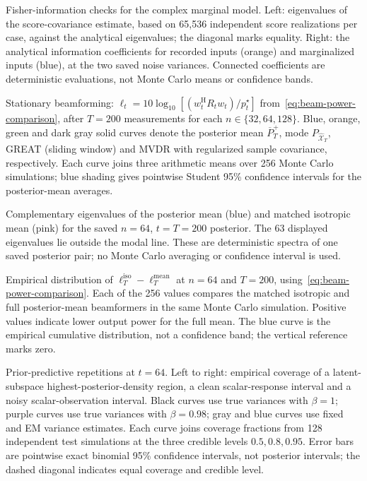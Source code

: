 \caption{Fisher-information checks for the complex marginal model. Left: eigenvalues of the score-covariance estimate, based on 65,536 independent score realizations per case, against the analytical eigenvalues; the diagonal marks equality. Right: the analytical information coefficients for recorded inputs (orange) and marginalized inputs (blue), at the two saved noise variances. Connected coefficients are deterministic evaluations, not Monte Carlo means or confidence bands.}

\caption{Stationary beamforming: $\ell_t=10\log_{10}[(w_t^{\mathrm H}R_tw_t)/p_t^\star]$ from~\eqref{eq:beam-power-comparison}, after $T=200$ measurements for each $n\in\{32,64,128\}$. Blue, orange, green and dark gray solid curves denote the posterior mean $\overline P_T^+$, mode $P_{\widehat{\mathcal X}_T}$, GREAT (sliding window) and MVDR with regularized sample covariance, respectively. Each curve joins three arithmetic means over 256 Monte Carlo simulations; blue shading gives pointwise Student 95\% confidence intervals for the posterior-mean averages.}

\caption{Complementary eigenvalues of the posterior mean (blue) and matched isotropic mean (pink) for the saved $n=64$, $t=T=200$ posterior. The 63 displayed eigenvalues lie outside the modal line. These are deterministic spectra of one saved posterior pair; no Monte Carlo averaging or confidence interval is used.}

\caption{Empirical distribution of $\ell_T^{\mathrm{iso}}-\ell_T^{\mathrm{mean}}$ at $n=64$ and $T=200$, using~\eqref{eq:beam-power-comparison}. Each of the 256 values compares the matched isotropic and full posterior-mean beamformers in the same Monte Carlo simulation. Positive values indicate lower output power for the full mean. The blue curve is the empirical cumulative distribution, not a confidence band; the vertical reference marks zero.}

\caption{Prior-predictive repetitions at $t=64$. Left to right: empirical coverage of a latent-subspace highest-posterior-density region, a clean scalar-response interval and a noisy scalar-observation interval. Black curves use true variances with $\beta=1$; purple curves use true variances with $\beta=0.98$; gray and blue curves use fixed and EM variance estimates. Each curve joins coverage fractions from 128 independent test simulations at the three credible levels $0.5,0.8,0.95$. Error bars are pointwise exact binomial 95\% confidence intervals, not posterior intervals; the dashed diagonal indicates equal coverage and credible level.}

